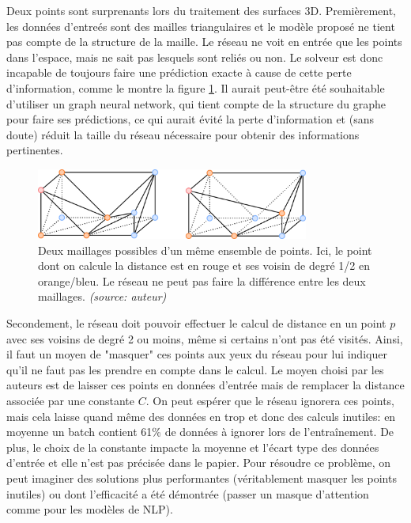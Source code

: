 \documentclass[11pt]{article} %
\begin{document}
Deux points sont surprenants lors du traitement des surfaces 3D. Premièrement, les données d'entreés sont des mailles triangulaires et le modèle proposé ne tient pas compte de la structure de la maille. Le réseau ne voit en entrée que les points dans l'espace, mais ne sait pas lesquels sont reliés ou non. Le solveur est donc incapable de toujours faire une prédiction exacte à cause de cette perte d'information, comme le montre la figure \ref{verts}. Il aurait peut-être été souhaitable d'utiliser un graph neural network, qui tient compte de la structure du graphe pour faire ses prédictions, ce qui aurait évité la perte d'information et (sans doute) réduit la taille du réseau nécessaire pour obtenir des informations pertinentes. 

\begin{figure}[h]
\centering
\includegraphics[width=0.8\textwidth]{imgs/verts}
\caption{Deux maillages possibles d'un même ensemble de points. Ici, le point dont on calcule la distance est en rouge et ses voisin de degré 1/2 en orange/bleu. Le réseau ne peut pas faire la différence entre les deux maillages. \textit{(source: auteur)}}
\label{verts}
\end{figure}

Secondement, le réseau doit pouvoir effectuer le calcul de distance en un point $p$ avec ses voisins de degré 2 ou moins, même si certains n'ont pas été visités. Ainsi, il faut un moyen de "masquer" ces points aux yeux du réseau pour lui indiquer qu'il ne faut pas les prendre en compte dans le calcul. Le moyen choisi par les auteurs est de laisser ces points en données d'entrée mais de remplacer la distance associée par une constante $C$. On peut espérer que le réseau ignorera ces points, mais cela laisse quand même des données en trop et donc des calculs inutiles: en moyenne un batch contient 61\% de données à ignorer lors de l'entraînement. De plus, le choix de la constante impacte la moyenne et l'écart type des données d'entrée et elle n'est pas précisée dans le papier. Pour résoudre ce problème, on peut imaginer des solutions plus performantes (véritablement masquer les points inutiles) ou dont l'efficacité a été démontrée (passer un masque d'attention comme pour les modèles de NLP).
\end{document}
